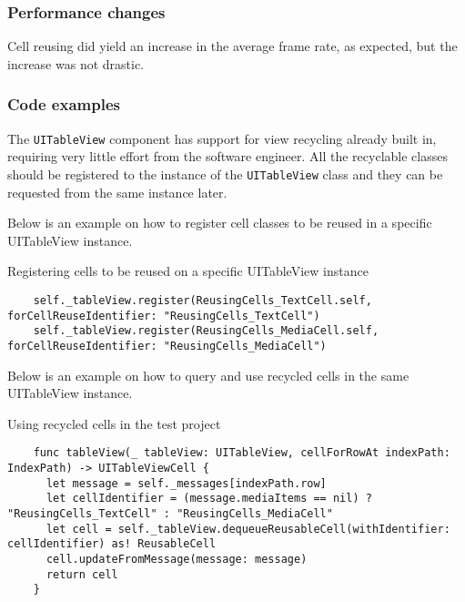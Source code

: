 \documentclass[a4paper,12pt]{article}
\begin{document}
\subsubsection{Performance changes}
Cell reusing did yield an increase in the average frame rate, as expected, but the increase was not drastic.


\subsubsection{Code examples}
The \texttt{UITableView} component has support for view recycling already built in, requiring very little effort from the software engineer. All the recyclable classes should be registered to the instance of the \texttt{UITableView} class and they can be requested from the same instance later.

Below is an example on how to register cell classes to be reused in a specific UITableView instance.
\begin{listing}[H]
  \caption{Registering cells to be reused on a specific UITableView instance}
  \begin{verbatim}
    self._tableView.register(ReusingCells_TextCell.self, forCellReuseIdentifier: "ReusingCells_TextCell")
    self._tableView.register(ReusingCells_MediaCell.self, forCellReuseIdentifier: "ReusingCells_MediaCell")
  \end{verbatim}
\end{listing}

Below is an example on how to query and use recycled cells in the same UITableView instance.
\begin{listing}[H]
  \caption{Using recycled cells in the test project}
  \begin{verbatim}
    func tableView(_ tableView: UITableView, cellForRowAt indexPath: IndexPath) -> UITableViewCell {
      let message = self._messages[indexPath.row]
      let cellIdentifier = (message.mediaItems == nil) ? "ReusingCells_TextCell" : "ReusingCells_MediaCell"
      let cell = self._tableView.dequeueReusableCell(withIdentifier: cellIdentifier) as! ReusableCell
      cell.updateFromMessage(message: message)
      return cell
    }
  \end{verbatim}
\end{listing}

\end{document}
